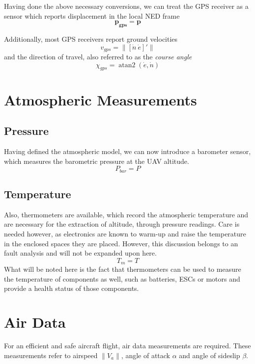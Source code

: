 Having done the above necessary conversions, we can treat the GPS receiver as a sensor which reports displacement in the local NED frame
\begin{equation}
\bm{p_{gps}} = \bm{p}
\end{equation}

Additionally, most GPS receivers report ground velocities
\begin{equation}
v_{gps} = \lVert [\dot{n}\ \dot{e}]' \rVert
\end{equation}
and the direction of travel, also referred to as the \emph{course angle}
\begin{equation}
\chi_{gps} = \operatorname{atan2}\left({\dot{e}},{\dot{n}}\right)
\end{equation}

\section{Atmospheric Measurements}

\subsection{Pressure}
Having defined the atmospheric model, we can now introduce a barometer sensor, which measures the barometric pressure at the UAV altitude.
\begin{equation}
	P_{bar} = P
\end{equation}

\subsection{Temperature}
Also, thermometers are available, which record the atmospheric temperature and are necessary for the extraction of altitude, through pressure readings. Care is needed however, as electronics are known to warm-up and raise the temperature in the enclosed spaces they are placed. However, this discussion belongs to an fault analysis and will not be expanded upon here.
\begin{equation}
	T_m =  T 
\end{equation}
What will be noted here is the fact that thermometers can be used to measure the temperature of components as well, such as batteries, ESCs or motors and provide a health status of those components.

\section{Air Data}
For an efficient and safe aircraft flight, air data measurements are required. These measurements refer to airspeed $\lVert V_a \lVert$, angle of attack $\alpha$ and angle of sideslip $\beta$.

